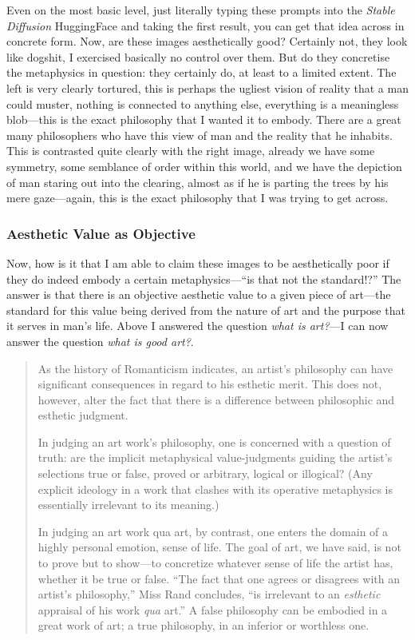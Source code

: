 \documentclass[11pt]{article}
\begin{document}
Even on the most basic level, just literally typing these prompts into the \emph{Stable Diffusion} HuggingFace and taking the first result, you can get that idea across in concrete form. Now, are these images aesthetically good? Certainly not, they look like dogshit, I exercised basically no control over them. But do they concretise the metaphysics in question: they certainly do, at least to a limited extent. The left is very clearly tortured, this is perhaps the ugliest vision of reality that a man could muster, nothing is connected to anything else, everything is a meaningless blob---this is the exact philosophy that I wanted it to embody. There are a great many philosophers who have this view of man and the reality that he inhabits. This is contrasted quite clearly with the right image, already we have some symmetry, some semblance of order within this world, and we have the depiction of man staring out into the clearing, almost as if he is parting the trees by his mere gaze---again, this is the exact philosophy that I was trying to get across.

\subsubsection*{Aesthetic Value as Objective}
\label{sec:org0aa444d}
Now, how is it that I am able to claim these images to be aesthetically poor if they do indeed embody a certain metaphysics---``is that not the standard!?'' The answer is that there is an objective aesthetic value to a given piece of art---the standard for this value being derived from the nature of art and the purpose that it serves in man's life. Above I answered the question \emph{what is art?}---I can now answer the question \emph{what is good art?}.

\begin{quote}
As the history of Romanticism indicates, an artist's philosophy can have significant consequences in regard to his esthetic merit. This does not, however, alter the fact that there is a difference between philosophic and esthetic judgment.

In judging an art work's philosophy, one is concerned with a question of truth: are the implicit metaphysical value-judgments guiding the artist's selections true or false, proved or arbitrary, logical or illogical? (Any explicit ideology in a work that clashes with its operative metaphysics is essentially irrelevant to its meaning.)

In judging an art work qua art, by contrast, one enters the domain of a highly personal emotion, sense of life. The goal of art, we have said, is not to prove but to show---to concretize whatever sense of life the artist has, whether it be true or false. ``The fact that one agrees or disagrees with an artist's philosophy,'' Miss Rand concludes, ``is irrelevant to an \emph{esthetic} appraisal of his work \emph{qua} art.'' A false philosophy can be embodied in a great work of art; a true philosophy, in an inferior or worthless one.
\end{quote}
\end{document}
